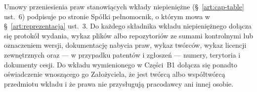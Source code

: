 \documentclass[12pt,a4paper]{report}
\begin{document}
Umowy przeniesienia praw stanowiących wkłady niepieniężne (§~\ref{art:cap-table} ust.~6) podpisuje po stronie Spółki pełnomocnik, o którym mowa w §~\ref{art:reprezentacja} ust.~3. Do każdego składnika wkładu niepieniężnego dołącza się protokół wydania, wykaz plików albo repozytoriów ze sumami kontrolnymi lub oznaczeniem wersji, dokumentację nabycia praw, wykaz twórców, wykaz licencji zewnętrznych oraz --- w przypadku patentów i zgłoszeń --- numery, terytoria i dokumenty cesji. Do wkładu wymienionego w Części~B1 dołącza się ponadto oświadczenie wnoszącego go Założyciela, że jest twórcą albo współtwórcą przedmiotu wkładu i że prawa nie przysługują pracodawcy ani innej osobie.
\end{document}
